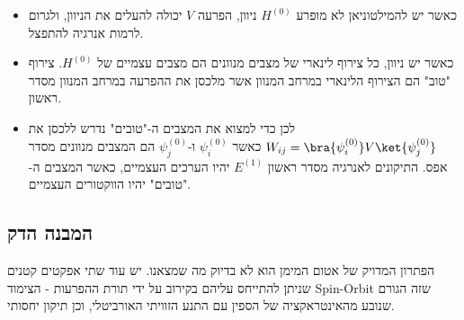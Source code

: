 \documentclass{tstextbook}
\begin{document}
\begin{summary}
  \begin{itemize}
    \item כאשר יש להמילטוניאן לא מופרע \(H^{(0)}\) ניוון, הפרעה \(V\) יכולה להעלים את הניוון, ולגרום לרמות אנרגיה להתפצל.
    \item כאשר יש ניוון, כל צירוף לינארי של מצבים מנוונים הם מצבים עצמיים של \(H^{(0)}\). צירוף "טוב" הם הצירוף הלינארי במרחב המנוון אשר מלכסן את ההפרעה במרחב המנוון מסדר ראשון.
    \item לכן כדי למצוא את המצבים ה-"טובים" נדרש ללכסן את \(W_{ij}=\bra{\psi_{i}^{(0)}}V\ket{\psi_{j}^{(0)}}\) כאשר \(\psi_{i}^{(0)}\) ו-\(\psi_{j}^{(0)}\) הם המצבים מנוונים מסדר אפס. התיקונים לאנרגיה מסדר ראשון \(E^{(1)}\) יהיו הערכים העצמיים, כאשר המצבים ה-"טובים" יהיו הווקטורים העצמיים.
  \end{itemize}
\end{summary}
\subsection{המבנה הדק}

הפתרון המדויק של אטום המימן הוא לא בדיוק מה שמצאנו. יש עוד שתי אפקטים קטנים שניתן להתייחס עליהם בקירוב על ידי תורת ההפרעות - הצימוד Spin-Orbit שזה הגורם שנובע מהאינטראקציה של הספין עם התנע הזוויתי האורביטלי, וכן תיקון יחסותי.
\end{document}
